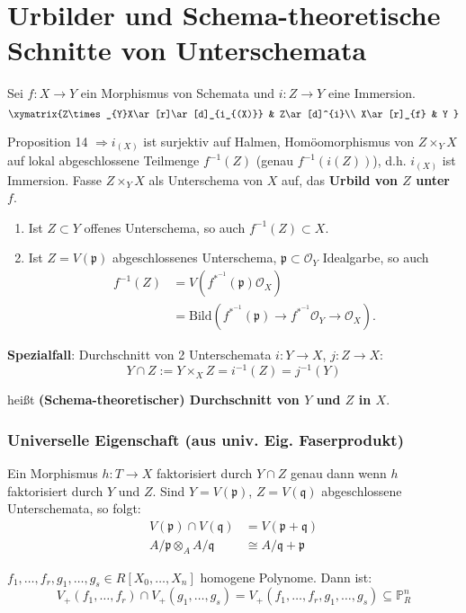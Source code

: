 \section{Urbilder und Schema-theoretische Schnitte von Unterschemata}

Sei $f:X\rightarrow Y$ ein Morphismus von Schemata und $i:Z\rightarrow Y$
eine Immersion.
\[
  \xymatrix{Z\times_{Y}X\ar[r]\ar[d]_{i_{(X)}} & Z\ar[d]^{i}\\
    X\ar[r]_{f} & Y
  }
\]

Proposition 14 $\Longrightarrow i_{(X)}$ ist surjektiv auf Halmen,
Homöomorphismus von $Z\times_{Y}X$ auf lokal abgeschlossene Teilmenge
$f^{-1}(Z)$ (genau $f^{-1}(i(Z))$), d.h. $i_{(X)}$ ist Immersion.
Fasse $Z\times_{Y}X$ als Unterschema von $X$ auf, das \textbf{Urbild
  von $Z$ unter $f$}.
\begin{rem*}
  \mbox{}
  \begin{enumerate}
  \item Ist $Z\subset Y$ offenes Unterschema, so auch $f^{-1}(Z)\subset X$.
  \item Ist $Z=V(\mathfrak{p})$ abgeschlossenes Unterschema, $\mathfrak{p}\subset\mathcal{O}_{Y}$
    Idealgarbe, so auch 
    \begin{align*}
      f^{-1}(Z) & =V(f^{\ast^{-1}}(\mathfrak{p})\mathcal{O}_{X})\\
                & =\text{Bild}(f^{\ast^{-1}}(\mathfrak{p})\rightarrow f^{\ast^{-1}}\mathcal{O}_{Y}\rightarrow\mathcal{O}_{X}).
    \end{align*}
  \end{enumerate}
  \textbf{Spezialfall}: Durchschnitt von 2 Unterschemata $i:Y\rightarrow X$,
  $j:Z\rightarrow X$:
  \[
    Y\cap Z:=Y\times_{X}Z=i^{-1}(Z)=j^{-1}(Y)
  \]

  heißt \textbf{(Schema-theoretischer) Durchschnitt von $Y$ und $Z$
    in $X$}.
\end{rem*}

\subsubsection*{Universelle Eigenschaft (aus univ. Eig. Faserprodukt)}

Ein Morphismus $h:T\rightarrow X$ faktorisiert durch $Y\cap Z$ genau
dann wenn $h$ faktorisiert durch $Y$ und $Z$. Sind $Y=V(\mathfrak{p})$,
$Z=V(\mathfrak{q})$ abgeschlossene Unterschemata, so folgt:
\begin{align*}
  V(\mathfrak{p})\cap V(\mathfrak{q}) & =V(\mathfrak{p}+\mathfrak{q})\\
  A/\mathfrak{p}\otimes_{A}A/\mathfrak{q} & \cong A/\mathfrak{q+}\mathfrak{p}
\end{align*}

\begin{example*}
  $f_{1},\ldots,f_{r},g_{1},\ldots,g_{s}\in R[X_{0},\ldots,X_{n}]$
  homogene Polynome. Dann ist:
  \[
    V_{+}(f_{1},\ldots,f_{r})\cap V_{+}(g_{1},\ldots,g_{s})=V_{+}(f_{1},\ldots,f_{r},g_{1},\ldots,g_{s})\subseteq\mathbb{P}_{R}^{n}
  \]
\end{example*}
